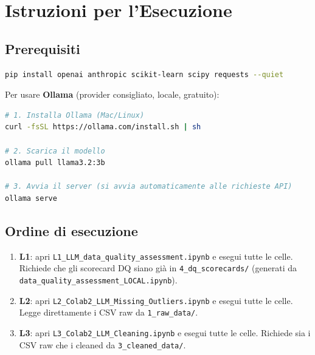 \documentclass[12pt,a4paper]{article}
\begin{document}
\section{Istruzioni per l'Esecuzione}

\subsection{Prerequisiti}

\begin{lstlisting}[language=bash, caption=Installazione dipendenze Python]
pip install openai anthropic scikit-learn scipy requests --quiet
\end{lstlisting}

Per usare \textbf{Ollama} (provider consigliato, locale, gratuito):

\begin{lstlisting}[language=bash, caption=Installazione e avvio Ollama]
# 1. Installa Ollama (Mac/Linux)
curl -fsSL https://ollama.com/install.sh | sh

# 2. Scarica il modello
ollama pull llama3.2:3b

# 3. Avvia il server (si avvia automaticamente alle richieste API)
ollama serve
\end{lstlisting}

\subsection{Ordine di esecuzione}

\begin{enumerate}
  \item \textbf{L1}: apri \texttt{L1\_LLM\_data\_quality\_assessment.ipynb} e
        esegui tutte le celle. Richiede che gli scorecard DQ siano già in
        \texttt{4\_dq\_scorecards/} (generati da \texttt{data\_quality\_assessment\_LOCAL.ipynb}).
  \item \textbf{L2}: apri \texttt{L2\_Colab2\_LLM\_Missing\_Outliers.ipynb} e
        esegui tutte le celle. Legge direttamente i CSV raw da \texttt{1\_raw\_data/}.
  \item \textbf{L3}: apri \texttt{L3\_Colab2\_LLM\_Cleaning.ipynb} e
        esegui tutte le celle. Richiede sia i CSV raw che i cleaned da
        \texttt{3\_cleaned\_data/}.
\end{enumerate}
\end{document}
